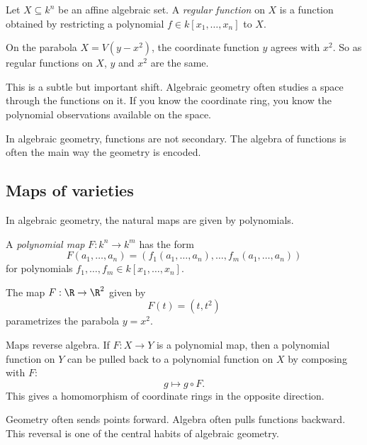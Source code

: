 \begin{definition}
Let $X\subseteq k^n$ be an affine algebraic set. A \emph{regular function} on
$X$ is a function obtained by restricting a polynomial
$f\in k[x_1,\ldots,x_n]$ to $X$.
\end{definition}

\begin{example}
On the parabola $X=V(y-x^2)$, the coordinate function $y$ agrees with $x^2$.
So as regular functions on $X$, $y$ and $x^2$ are the same.
\end{example}

This is a subtle but important shift. Algebraic geometry often studies a space
through the functions on it. If you know the coordinate ring, you know the
polynomial observations available on the space.

\begin{focusbox}
In algebraic geometry, functions are not secondary. The algebra of functions is
often the main way the geometry is encoded.
\end{focusbox}

\subsection{Maps of varieties}

In algebraic geometry, the natural maps are given by polynomials.

\begin{definition}
A \emph{polynomial map} $F:k^n\to k^m$ has the form
\[
F(a_1,\ldots,a_n)=
(f_1(a_1,\ldots,a_n),\ldots,f_m(a_1,\ldots,a_n))
\]
for polynomials $f_1,\ldots,f_m\in k[x_1,\ldots,x_n]$.
\end{definition}

\begin{example}
The map $F:\R\to\R^2$ given by
\[
F(t)=(t,t^2)
\]
parametrizes the parabola $y=x^2$.
\end{example}

Maps reverse algebra. If $F:X\to Y$ is a polynomial map, then a polynomial
function on $Y$ can be pulled back to a polynomial function on $X$ by composing
with $F$:
\[
g\mapsto g\circ F.
\]
This gives a homomorphism of coordinate rings in the opposite direction.

\begin{focusbox}
Geometry often sends points forward. Algebra often pulls functions backward.
This reversal is one of the central habits of algebraic geometry.
\end{focusbox}

